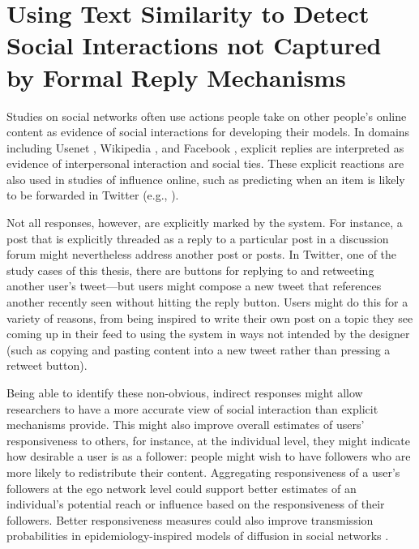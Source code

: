 \chapter{Using Text Similarity to Detect Social Interactions not Captured by Formal Reply Mechanisms\raisebox{.3\baselineskip}{\normalsize\footnotemark}}
\label{ch:reactions}

Studies on social networks often use actions people take on other people's online content as evidence of social interactions for developing their models. In domains including Usenet \cite{Joyce2006}, Wikipedia \cite{Black2011}, and Facebook \cite{Gilbert2009}, explicit replies are interpreted as evidence of interpersonal interaction and social ties.  These explicit reactions are also used in studies of influence online, such as predicting when an item is likely to be forwarded in Twitter (e.g., \cite{Suh2010,Comarela2012}).

Not all responses, however, are explicitly marked by the system.  For instance, a post that is explicitly threaded as a reply to a particular post in a discussion forum might nevertheless address another post or posts.  In Twitter, one of the study cases of this thesis, there are buttons for replying to and retweeting another user's tweet---but users might compose a new tweet that references another recently seen without hitting the reply button.  Users might do this for a variety of reasons, from being inspired to write their own post on a topic they see coming up in their feed to using the system in ways not intended by the designer (such as copying and pasting content into a new tweet rather than pressing a retweet button).  

Being able to identify these non-obvious, indirect responses might allow researchers to have a more accurate view of social interaction than explicit mechanisms provide.  This might also improve overall estimates of users' responsiveness to others, for instance,
at the individual level, they might indicate how desirable a user is as a follower: people might wish to have followers who are more likely to redistribute their content.  Aggregating responsiveness of a user's followers at the ego network level could support better estimates of an individual's potential reach or influence \cite{Domingos2001} based on the responsiveness of their followers.  Better responsiveness measures could also improve transmission probabilities in epidemiology-inspired models of diffusion in social networks \cite{Bakshy2012a}. 

